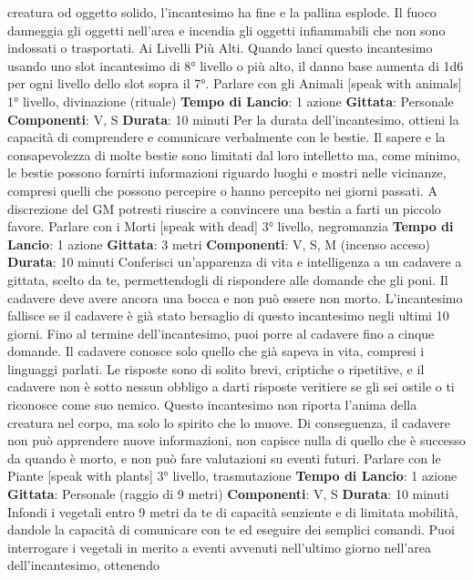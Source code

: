 \begin{multicols}{2}
creatura od oggetto solido, l’incantesimo ha fine e la
pallina esplode.
Il fuoco danneggia gli oggetti nell’area e incendia gli
oggetti infiammabili che non sono indossati o
trasportati.
Ai Livelli Più Alti. Quando lanci questo incantesimo
usando uno slot incantesimo di 8° livello o più alto, il
danno base aumenta di 1d6 per ogni livello dello slot
sopra il 7°.
Parlare con gli Animali
[speak with animals]
1° livello, divinazione (rituale)
\textbf{Tempo di Lancio}: 1 azione
\textbf{Gittata}: Personale
\textbf{Componenti}: V, S
\textbf{Durata}: 10 minuti
Per la durata dell’incantesimo, ottieni la capacità di
comprendere e comunicare verbalmente con le bestie.
Il sapere e la consapevolezza di molte bestie sono
limitati dal loro intelletto ma, come minimo, le bestie
possono fornirti informazioni riguardo luoghi e mostri
nelle vicinanze, compresi quelli che possono percepire
o hanno percepito nei giorni passati. A discrezione del
GM potresti riuscire a convincere una bestia a farti un
piccolo favore.
Parlare con i Morti
[speak with dead]
3° livello, negromanzia
\textbf{Tempo di Lancio}: 1 azione
\textbf{Gittata}: 3 metri
\textbf{Componenti}: V, S, M (incenso acceso)
\textbf{Durata}: 10 minuti
Conferisci un’apparenza di vita e intelligenza a un
cadavere a gittata, scelto da te, permettendogli di
rispondere alle domande che gli poni. Il cadavere deve
avere ancora una bocca e non può essere non morto.
L’incantesimo fallisce se il cadavere è già stato
bersaglio di questo incantesimo negli ultimi 10 giorni.
Fino al termine dell’incantesimo, puoi porre al cadavere
fino a cinque domande. Il cadavere conosce solo quello
che già sapeva in vita, compresi i linguaggi parlati. Le
risposte sono di solito brevi, criptiche o ripetitive, e il
cadavere non è sotto nessun obbligo a darti risposte
veritiere se gli sei ostile o ti riconosce come suo
nemico. Questo incantesimo non riporta l’anima della
creatura nel corpo, ma solo lo spirito che lo muove. Di
conseguenza, il cadavere non può apprendere nuove
informazioni, non capisce nulla di quello che è
successo da quando è morto, e non può fare
valutazioni su eventi futuri.
Parlare con le Piante
[speak with plants]
3° livello, trasmutazione
\textbf{Tempo di Lancio}: 1 azione
\textbf{Gittata}: Personale (raggio di 9 metri)
\textbf{Componenti}: V, S
\textbf{Durata}: 10 minuti
Infondi i vegetali entro 9 metri da te di capacità
senziente e di limitata mobilità, dandole la capacità di
comunicare con te ed eseguire dei semplici comandi.
Puoi interrogare i vegetali in merito a eventi avvenuti
nell’ultimo giorno nell’area dell’incantesimo, ottenendo

\end{multicols}
